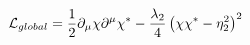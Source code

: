 \begin{equation}
{\cal L}_{global}=\frac{1}{2}\partial_{\mu} \chi \partial^{\mu} \chi^* - \frac{\lambda_2}{4}\left(\chi\chi^*-\eta^2_2\right)^2
\end{equation} 
